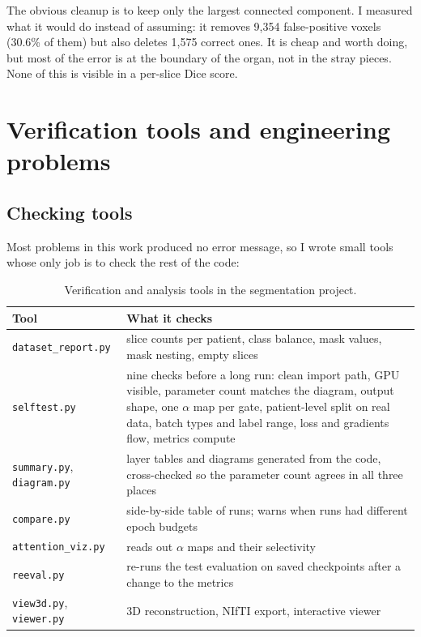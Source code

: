 \documentclass[11pt,a4paper]{article}
\newcommand{\code}[1]{\texttt{#1}}
\begin{document}
The obvious cleanup is to keep only the largest connected component. I measured
what it would do instead of assuming: it removes 9{,}354 false-positive voxels
(30.6\% of them) but also deletes 1{,}575 correct ones. It is cheap and worth
doing, but most of the error is at the boundary of the organ, not in the stray
pieces. None of this is visible in a per-slice Dice score.

\section{Verification tools and engineering problems}\label{sec:eng}

\subsection{Checking tools}

Most problems in this work produced no error message, so I wrote small tools whose
only job is to check the rest of the code:

\begin{table}[H]
\centering\small
\begin{tabular}{>{\raggedright}p{3.2cm}p{11cm}}
\toprule
\textbf{Tool} & \textbf{What it checks} \\
\midrule
\code{dataset\_report.py} & slice counts per patient, class balance, mask values, mask nesting, empty slices \\
\code{selftest.py} & nine checks before a long run: clean import path, GPU visible, parameter count matches the diagram, output shape, one $\alpha$ map per gate, patient-level split on real data, batch types and label range, loss and gradients flow, metrics compute \\
\code{summary.py}, \code{diagram.py} & layer tables and diagrams generated from the code, cross-checked so the parameter count agrees in all three places \\
\code{compare.py} & side-by-side table of runs; warns when runs had different epoch budgets \\
\code{attention\_viz.py} & reads out $\alpha$ maps and their selectivity \\
\code{reeval.py} & re-runs the test evaluation on saved checkpoints after a change to the metrics \\
\code{view3d.py}, \code{viewer.py} & 3D reconstruction, NIfTI export, interactive viewer \\
\bottomrule
\end{tabular}
\caption{Verification and analysis tools in the segmentation project.}
\end{table}
\end{document}

